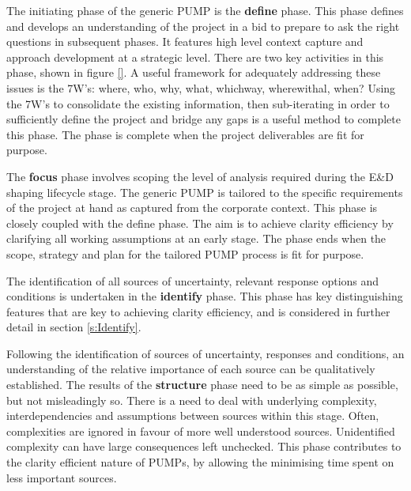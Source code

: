 The initiating phase of the generic PUMP is the \textbf{define} phase.
This phase defines and develops an understanding of the project in a bid to prepare to ask the right questions in subsequent phases.
It features high level context capture and approach development at a strategic level.
There are two key activities in this phase, shown in figure \ref{}.
A useful framework for adequately addressing these issues is the 7W's: where, who, why, what, whichway, wherewithal, when? 
Using the 7W's to consolidate the existing information, then sub-iterating in order to sufficiently define the project and bridge any gaps is a useful method to complete this phase.
The phase is complete when the project deliverables are fit for purpose.

The \textbf{focus} phase involves scoping the level of analysis required during the E\&D shaping lifecycle stage.
The generic PUMP is tailored to the specific requirements of the project at hand as captured from the corporate context.
This phase is closely coupled with the define phase.
The aim is to achieve clarity efficiency by clarifying all working assumptions at an early stage.
The phase ends when the scope, strategy and plan for the tailored PUMP process is fit for purpose.

The identification of all sources of uncertainty, relevant response options and conditions is undertaken in the \textbf{identify} phase.
This phase has key distinguishing features that are key to achieving clarity efficiency, and is considered in further detail in section \ref{s:Identify}.

Following the identification of sources of uncertainty, responses and conditions, an understanding of the relative importance of each source can be qualitatively established.
The results of the \textbf{structure} phase need to be as simple as possible, but not misleadingly so.
There is a need to deal with underlying complexity, interdependencies and assumptions between sources within this stage.
Often, complexities are ignored in favour of more well understood sources.
Unidentified complexity can have large consequences left unchecked.
This phase contributes to the clarity efficient nature of PUMPs, by allowing the minimising time spent on less important sources.

